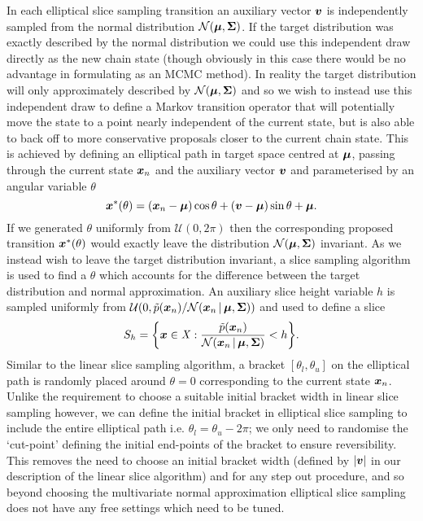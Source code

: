 In each elliptical slice sampling transition an auxiliary vector $\boldsymbol{v}$ is independently sampled from the normal distribution $\nrm{\vct{\mu},\mtx{\Sigma}}$. If the target distribution was exactly described by the normal distribution we could use this independent draw directly as the new chain state (though obviously in this case there would be no advantage in formulating as an \ac{MCMC} method). In reality the target distribution will only approximately described by $\nrm{\vct{\mu},\mtx{\Sigma}}$ and so we wish to instead use this independent draw to define a Markov transition operator that will potentially move the state to a point nearly independent of the current state, but is also able to back off to more conservative proposals closer to the current chain state. This is achieved by defining an elliptical path in target space centred at $\boldsymbol{\mu}$, passing through the current state $\boldsymbol{x}_n$ and the auxiliary vector $\boldsymbol{v}$ and parameterised by an angular variable $\theta$
\begin{equation}\label{eq:elliptical-path}
  \boldsymbol{x}^*(\theta) = (\boldsymbol{x}_n - \boldsymbol{\mu}) \cos\theta + (\boldsymbol{v} - \boldsymbol{\mu}) \sin\theta + \boldsymbol{\mu}.
\end{equation}
If we generated $\theta$ uniformly from $\mathcal{U}(0,2\pi)$ then the corresponding proposed transition $\boldsymbol{x}^*(\theta)$ would exactly leave the distribution $\nrm{\vct{\mu},\mtx{\Sigma}}$ invariant. As we instead wish to leave the target distribution invariant, a slice sampling algorithm is used to find a $\theta$  which accounts for the difference between the target distribution and normal approximation. An auxiliary slice height variable $h$ is sampled uniformly from $\mathcal{U}\lpa 0,\utgtdens(\vct{x}_n) / \nrm{\vct{x}_n \gvn \vct{\mu}, \mtx{\Sigma}}\rpa$ and used to define a slice
\begin{equation}
  S_h = 
  \lbr \vct{x} \in \set{X} : \frac{\utgtdens(\vct{x}_n)}{\nrm{\vct{x}_n \gvn \vct{\mu}, \mtx{\Sigma}}} < h \rbr. 
\end{equation}
Similar to the linear slice sampling algorithm, a bracket $[\theta_l, \theta_u]$ on the elliptical path is randomly placed around $\theta = 0$ corresponding to the current state $\boldsymbol{x}_n$. Unlike the requirement to choose a suitable initial bracket width in linear slice sampling however, we can define the initial bracket in elliptical slice sampling to include the entire elliptical path i.e. $\theta_l = \theta_u - 2\pi$; we only need to randomise the `cut-point' defining the initial end-points of the bracket to ensure reversibility. This removes the need to choose an initial bracket width (defined by $|\boldsymbol{v}|$ in our description of the linear slice algorithm) and for any step out procedure, and so beyond choosing the multivariate normal approximation elliptical slice sampling does not have any free settings which need to be tuned.

